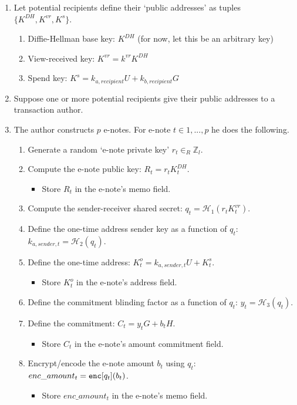 \begin{enumerate}
    \item Let potential recipients define their `public addresses' as tuples $\{K^{DH}, K^{vr}, K^s\}$.
    \begin{enumerate}
        \item Diffie-Hellman base key: $K^{DH}$ (for now, let this be an arbitrary key)
        \item View-received key: $K^{vr} = k^{vr} K^{DH}$
        \item Spend key: $K^s = k_{a,recipient} U + k_{b,recipient} G$
    \end{enumerate}

    \item Suppose one or more potential recipients give their public addresses to a transaction author.

    \item The author constructs $p$ e-notes. For e-note $t \in 1,...,p$ he does the following.
    \begin{enumerate}
        \item Generate a random `e-note private key' $r_t \in_R \mathbb{Z}_l$.
        \item Compute the e-note public key: $R_t = r_t K^{DH}_t$.
        \begin{itemize}
            \item Store $R_t$ in the e-note's memo field.
        \end{itemize}
        \item Compute the sender-receiver shared secret: $q_t = \mathcal{H}_1(r_t K^{vr}_t)$.
        \item Define the one-time address sender key as a function of $q_t$: $k_{a,sender,t} = \mathcal{H}_2(q_t)$.
        \item Define the one-time address: $K^o_t = k_{a,sender,t} U + K^s_t$.
        \begin{itemize}
            \item Store $K^o_t$ in the e-note's address field.
        \end{itemize}
        \item Define the commitment blinding factor as a function of $q_t$: $y_t = \mathcal{H}_3(q_t)$.
        \item Define the commitment: $C_t = y_t G + b_t H$.
        \begin{itemize}
            \item Store $C_t$ in the e-note's amount commitment field.
        \end{itemize}
        \item Encrypt/encode the e-note amount $b_t$ using $q_t$: $enc\_amount_t = \textrm{\tt enc}[q_t](b_t)$.
        \begin{itemize}
            \item Store $enc\_amount_t$ in the e-note's memo field.
        \end{itemize}
    \end{enumerate}


\end{enumerate}
